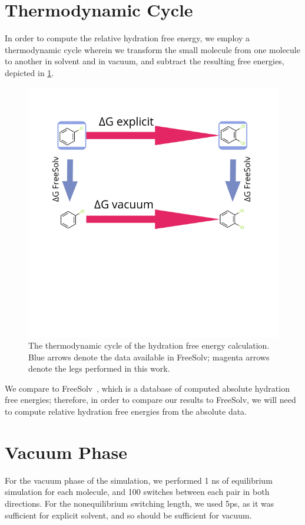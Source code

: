 \section{Thermodynamic Cycle}
%
In order to compute the relative hydration free energy, we employ a thermodynamic cycle wherein we transform the small molecule from one molecule to another in solvent and in vacuum, and subtract the resulting free energies, depicted in \ref{fig:thermocycle}.
%
\begin{figure}
    \centering
    \includegraphics[width=1.0\textwidth]{thermocycle.png}
    \caption{The thermodynamic cycle of the hydration free energy calculation. Blue arrows denote the data available in FreeSolv; magenta arrows denote the legs performed in this work.}
    \label{fig:thermocycle}
\end{figure}
%
We compare to FreeSolv~\cite{Mobley2014}, which is a database of computed absolute hydration free energies; therefore, in order to compare our results to FreeSolv, we will need to compute relative hydration free energies from the absolute data.
%
\section{Vacuum Phase}
%
For the vacuum phase of the simulation, we performed 1 ns of equilibrium simulation for each molecule, and 100 switches between each pair in both directions.
%
For the nonequilibrium switching length, we used 5ps, as it was sufficient for explicit solvent, and so should be sufficient for vacuum.
%
%
